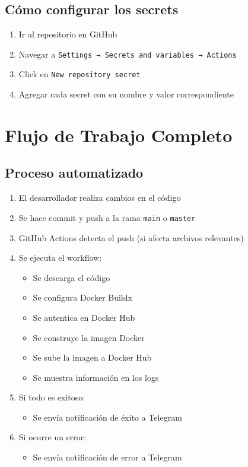 \documentclass{article}
\begin{document}
\subsection{Cómo configurar los secrets}
\begin{enumerate}
    \item Ir al repositorio en GitHub
    \item Navegar a \texttt{Settings → Secrets and variables → Actions}
    \item Click en \texttt{New repository secret}
    \item Agregar cada secret con su nombre y valor correspondiente
\end{enumerate}

\section{Flujo de Trabajo Completo}

\subsection{Proceso automatizado}
\begin{enumerate}
    \item El desarrollador realiza cambios en el código
    \item Se hace commit y push a la rama \texttt{main} o \texttt{master}
    \item GitHub Actions detecta el push (si afecta archivos relevantes)
    \item Se ejecuta el workflow:
    \begin{itemize}
        \item Se descarga el código
        \item Se configura Docker Buildx
        \item Se autentica en Docker Hub
        \item Se construye la imagen Docker
        \item Se sube la imagen a Docker Hub
        \item Se muestra información en los logs
    \end{itemize}
    \item Si todo es exitoso:
    \begin{itemize}
        \item Se envía notificación de éxito a Telegram
    \end{itemize}
    \item Si ocurre un error:
    \begin{itemize}
        \item Se envía notificación de error a Telegram
    \end{itemize}
\end{enumerate}
\end{document}
